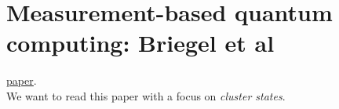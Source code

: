 \documentclass{book}
\theoremstyle{definition}
\begin{document}
\newpage

















\section{Measurement-based quantum computing: Briegel et al}
\href{https://www.nature.com/articles/nphys1157.pdf}{\underline{paper}}.\\

We want to read this paper with a focus on \textit{cluster states}.
\newpage
\end{document}
